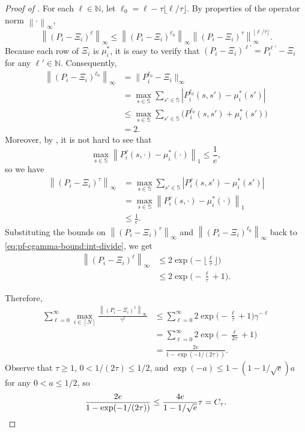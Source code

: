 \documentclass{article}
\theoremstyle{plain}
\theoremstyle{remark}
\newcommand{\norm}[1]{\left\lVert#1\right\rVert}
\newcommand{\normbig}[1]{\big\lVert#1\big\rVert}
\newcommand{\abs}[1]{\left\lvert#1\right\rvert}
\newcommand{\sspa}{\mathbb{S}}
\newcommand{\Ctau}{C_\tau}
\begin{document}
\begin{proof}[Proof of ]
    For each $\ell \in \mathbb{N}$, let $\ell_0 = \ell - \tau \lfloor \ell/\tau\rfloor$. 
    By properties of the operator norm $\norm{\cdot}_\infty$, 
    \begin{equation}
        \label{eq:pf-cgamma-bound:int-divide}
        \norm{(P_i - \Xi_i)^\ell}_\infty \leq \norm{(P_i - \Xi_i)^{\ell_0}}_\infty \norm{(P_i - \Xi_i)^\tau}_\infty^{\lfloor \ell/\tau \rfloor}. 
    \end{equation}
    Because each row of $\Xi_i$ is $\mu_i^*$, it is easy to verify that $(P_i - \Xi_i)^{\ell'} = P_i^{\ell'} - \Xi_i$ for any $\ell' \in \mathbb{N}$. Consequently, 
    \begin{align*}
        \norm{(P_i - \Xi_i)^{\ell_0}}_\infty
        &= \normbig{P_i^{\ell_0} - \Xi_i}_\infty \\
        &= \max_{s\in\sspa} \sum_{s'\in\sspa} \abs{P_i^{\ell_0}(s,s') - \mu_i^*(s')}  \\
        &\leq \max_{s\in\sspa} \sum_{s'\in\sspa} \big(P_i^{\ell_0}(s,s') + \mu_i^*(s')\big) \\
        &= 2.
    \end{align*}
    Moreover, by , it is not hard to see that 
    \[
        \max_{s\in\sspa} \norm{P_i^\tau(s,\cdot) - \mu_i^*(\cdot)}_1 \leq \frac{1}{e},
    \]
    so we have
    \begin{align}
        \nonumber
        \norm{(P_i - \Xi_i)^\tau}_\infty 
        &= \max_{s\in\sspa} \sum_{s'\in\sspa} \abs{P_i^\tau(s,s') - \mu_i^*(s')} \\
        \nonumber
        &= \max_{s\in\sspa} \norm{P_i^\tau(s,\cdot) - \mu_i^*(\cdot)}_1 \\
        \nonumber
        &\leq \frac{1}{e}.
    \end{align}
    Substituting the bounds on $\norm{(P_i - \Xi_i)^\tau}_\infty$ and $\norm{(P_i - \Xi_i)^{\ell_0}}_\infty$ back to \eqref{eq:pf-cgamma-bound:int-divide}, we get 
    \begin{align}
        \nonumber
        \norm{(P_i - \Xi_i)^\ell}_\infty
        &\leq 2\exp\Big(-\Big\lfloor \frac{\ell}{\tau} \Big\rfloor\Big) \\
        &\leq 2\exp\Big(-\frac{\ell}{\tau} + 1\Big).
    \end{align}

    Therefore, 
    \begin{align}
        \nonumber
        \sum_{\ell=0}^{\infty} \max_{i\in[N]}\frac{\norm{(P_i-\Xi_i)^\ell}_\infty}{\gamma^\ell}
        &\leq \sum_{\ell=0}^{\infty} 2\exp\Big(-\frac{\ell}{\tau} + 1\Big) \gamma^{-\ell} \\
        \nonumber
        &= \sum_{\ell=0}^{\infty} 2\exp\Big(-\frac{\ell}{2\tau} + 1\Big) \\
        &= \frac{2e}{1 - \exp(-1/(2\tau))}. 
    \end{align}
    Observe that $\tau \geq 1$, $0 < 1/(2\tau) \leq 1/2$, and $\exp(-a) \leq 1 - (1-1/\sqrt{e}) a$ for any $0 < a \leq 1/2$, so
    \[
        \frac{2e}{1 - \exp(-1/(2\tau))} \leq \frac{4e}{1-1/\sqrt{e}} \tau = \Ctau. \qedhere
    \]
\end{proof}
\end{document}
